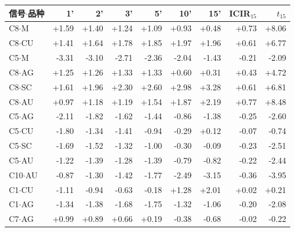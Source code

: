 \setlength{\tabcolsep}{4pt}
\begin{tabular}{lrrrrrrrr}
\toprule
信号$\cdot$品种 & 1' & 2' & 3' & 5' & 10' & 15' & ICIR$_{15}$ & $t_{15}$ \\
\midrule
C8$\cdot$M & +1.59 & +1.40 & +1.24 & +1.09 & +0.93 & +0.48 & +0.73 & +8.06 \\
C8$\cdot$CU & +1.41 & +1.64 & +1.78 & +1.85 & +1.97 & +1.96 & +0.61 & +6.77 \\
C5$\cdot$M & -3.31 & -3.10 & -2.71 & -2.36 & -2.04 & -1.43 & -0.21 & -2.09 \\
C8$\cdot$AG & +1.25 & +1.26 & +1.33 & +1.33 & +0.60 & +0.31 & +0.43 & +4.72 \\
C8$\cdot$SC & +1.61 & +1.96 & +2.30 & +2.60 & +2.98 & +3.28 & +0.61 & +6.81 \\
C8$\cdot$AU & +0.97 & +1.18 & +1.19 & +1.54 & +1.87 & +2.19 & +0.77 & +8.48 \\
C5$\cdot$AG & -2.11 & -1.82 & -1.62 & -1.44 & -0.86 & -1.38 & -0.25 & -2.60 \\
C5$\cdot$CU & -1.80 & -1.34 & -1.41 & -0.94 & -0.29 & +0.12 & -0.07 & -0.74 \\
C5$\cdot$SC & -1.69 & -1.52 & -1.32 & -1.00 & -0.30 & -0.09 & -0.23 & -2.51 \\
C5$\cdot$AU & -1.22 & -1.39 & -1.28 & -1.39 & -0.79 & -0.82 & -0.22 & -2.44 \\
C10$\cdot$AU & -0.87 & -1.30 & -1.42 & -1.77 & -2.49 & -3.15 & -0.36 & -3.95 \\
C1$\cdot$CU & -1.11 & -0.94 & -0.63 & -0.18 & +1.28 & +2.01 & +0.02 & +0.21 \\
C1$\cdot$AG & -1.34 & -1.38 & -1.68 & -1.75 & -1.32 & -1.06 & -0.20 & -2.08 \\
C7$\cdot$AG & +0.99 & +0.89 & +0.66 & +0.19 & -0.38 & -0.68 & -0.02 & -0.22 \\
\bottomrule
\end{tabular}
